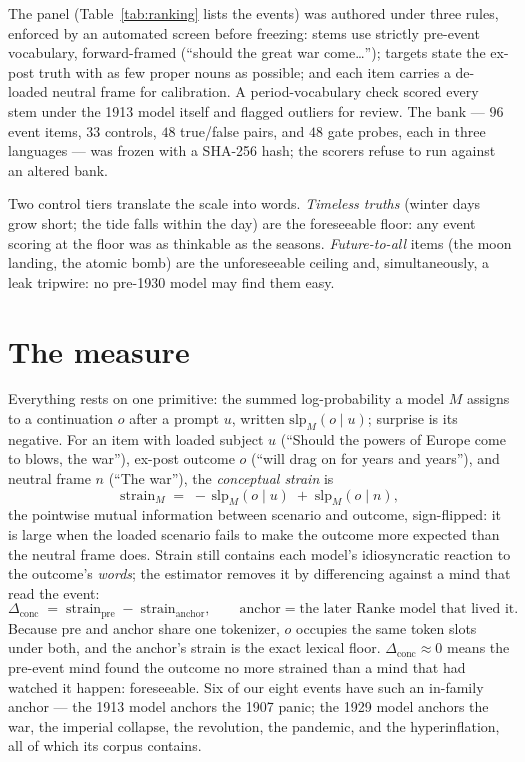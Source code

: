 \documentclass[11pt]{article}
\begin{document}
The panel (Table~\ref{tab:ranking} lists the events) was authored under three rules, enforced by an
automated screen before freezing: stems use strictly pre-event vocabulary, forward-framed (``should the
great war come\dots''); targets state the ex-post truth with as few proper nouns as possible; and each
item carries a de-loaded neutral frame for calibration. A period-vocabulary check scored every stem under
the 1913 model itself and flagged outliers for review. The bank --- $96$ event items, $33$ controls, $48$
true/false pairs, and $48$ gate probes, each in three languages --- was frozen with a SHA-256 hash;
the scorers refuse to run against an altered bank.

Two control tiers translate the scale into words. \emph{Timeless truths} (winter days grow short; the
tide falls within the day) are the foreseeable floor: any event scoring at the floor was as thinkable as
the seasons. \emph{Future-to-all} items (the moon landing, the atomic bomb) are the unforeseeable ceiling
and, simultaneously, a leak tripwire: no pre-1930 model may find them easy.

\section{The measure}\label{sec:measure}

Everything rests on one primitive: the summed log-probability a model $M$ assigns to a continuation $o$
after a prompt $u$, written $\mathrm{slp}_M(o \mid u)$; surprise is its negative. For an item with loaded
subject $u$ (``Should the powers of Europe come to blows, the war''), ex-post outcome $o$ (``will drag on
for years and years''), and neutral frame $n$ (``The war''), the \emph{conceptual strain} is
\[
\mathrm{strain}_M \;=\; -\,\mathrm{slp}_M(o \mid u) \;+\; \mathrm{slp}_M(o \mid n),
\]
the pointwise mutual information between scenario and outcome, sign-flipped: it is large when the loaded
scenario fails to make the outcome more expected than the neutral frame does. Strain still contains each
model's idiosyncratic reaction to the outcome's \emph{words}; the estimator removes it by differencing
against a mind that read the event:
\[
\Delta_{\text{conc}} \;=\; \mathrm{strain}_{\text{pre}} \;-\; \mathrm{strain}_{\text{anchor}},
\qquad \text{anchor} = \text{the later Ranke model that lived it.}
\]
Because pre and anchor share one tokenizer, $o$ occupies the same token slots under both, and the anchor's
strain is the exact lexical floor. $\Delta_{\text{conc}} \approx 0$ means the pre-event mind found the
outcome no more strained than a mind that had watched it happen: foreseeable. Six of our eight events have
such an in-family anchor --- the 1913 model anchors the 1907 panic; the 1929 model anchors the war, the
imperial collapse, the revolution, the pandemic, and the hyperinflation, all of which its corpus contains.
\end{document}
